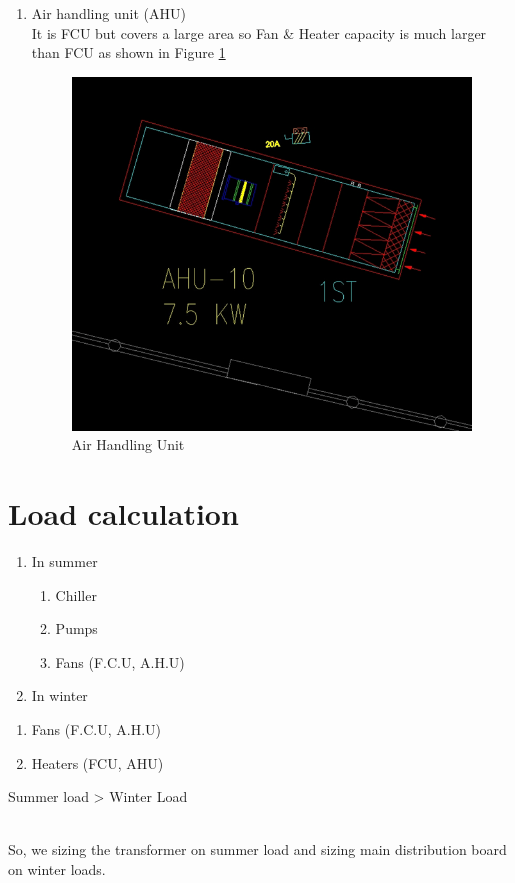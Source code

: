 \documentclass[12pt,fleqn]{book} %
\begin{document}
\begin{enumerate}
    \item Air handling unit (AHU)
    \\It is FCU but covers a large area so Fan \& Heater capacity is much larger than FCU as shown in Figure \ref{fig:h 6}
        \begin{figure}[h!]
    \centering
    \includegraphics[width=0.7\linewidth]{h 6.png}
    \caption{Air Handling Unit }
    \label{fig:h 6}
\end{figure}

\end{enumerate}
\section {Load calculation}
\begin{enumerate}
    \item  In summer
    \begin{enumerate}
    \item  Chiller
    \item Pumps
    \item Fans (F.C.U, A.H.U) 
  
\end{enumerate}

    \item In winter
\end{enumerate}
 \begin{enumerate}
    \item  Fans (F.C.U, A.H.U) 
    \item Heaters (FCU, AHU)
\end{enumerate}
 \begin{note} 
 Summer load > Winter Load 
\end{note}
\\ So, we sizing the transformer on summer load and sizing main distribution board on winter loads.
\end{document}
